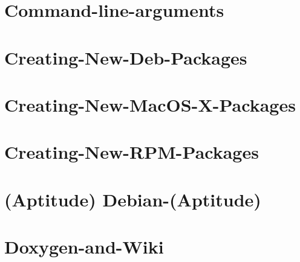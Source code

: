 \documentclass[twoside]{book}
\begin{document}
\chapter{Command-\/line-\/arguments}
\label{md__home_kodemonkey_workspace__t_s_g_l_docs-wiki__command-line-arguments}
\hypertarget{md__home_kodemonkey_workspace__t_s_g_l_docs-wiki__command-line-arguments}{}

\chapter{Creating-\/\-New-\/\-Deb-\/\-Packages}
\label{md__home_kodemonkey_workspace__t_s_g_l_docs-wiki__creating-_new-_deb-_packages}
\hypertarget{md__home_kodemonkey_workspace__t_s_g_l_docs-wiki__creating-_new-_deb-_packages}{}

\chapter{Creating-\/\-New-\/\-Mac\-O\-S-\/\-X-\/\-Packages}
\label{md__home_kodemonkey_workspace__t_s_g_l_docs-wiki__creating-_new-_mac_o_s-_x-_packages}
\hypertarget{md__home_kodemonkey_workspace__t_s_g_l_docs-wiki__creating-_new-_mac_o_s-_x-_packages}{}

\chapter{Creating-\/\-New-\/\-R\-P\-M-\/\-Packages}
\label{md__home_kodemonkey_workspace__t_s_g_l_docs-wiki__creating-_new-_r_p_m-_packages}
\hypertarget{md__home_kodemonkey_workspace__t_s_g_l_docs-wiki__creating-_new-_r_p_m-_packages}{}

\chapter{(Aptitude) Debian-\/(Aptitude)}
\label{md__home_kodemonkey_workspace__t_s_g_l_docs-wiki__debian-}
\hypertarget{md__home_kodemonkey_workspace__t_s_g_l_docs-wiki__debian-}{}

\chapter{Doxygen-\/and-\/\-Wiki}
\label{md__home_kodemonkey_workspace__t_s_g_l_docs-wiki__doxygen-and-_wiki}
\hypertarget{md__home_kodemonkey_workspace__t_s_g_l_docs-wiki__doxygen-and-_wiki}{}

\end{document}
